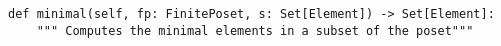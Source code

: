 \begin{verbatim}
def minimal(self, fp: FinitePoset, s: Set[Element]) -> Set[Element]:
    """ Computes the minimal elements in a subset of the poset"""
\end{verbatim}